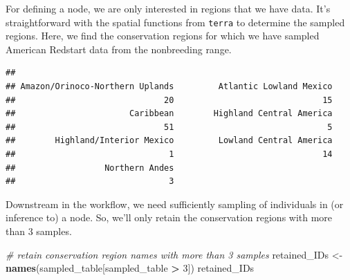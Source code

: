 \documentclass[
]{book}
\newenvironment{Shaded}{\begin{snugshade}}{\end{snugshade}}
\newcommand{\AttributeTok}[1]{\textcolor[rgb]{0.13,0.29,0.53}{#1}}
\newcommand{\CommentTok}[1]{\textcolor[rgb]{0.56,0.35,0.01}{\textit{#1}}}
\newcommand{\DecValTok}[1]{\textcolor[rgb]{0.00,0.00,0.81}{#1}}
\newcommand{\FunctionTok}[1]{\textcolor[rgb]{0.13,0.29,0.53}{\textbf{#1}}}
\newcommand{\NormalTok}[1]{#1}
\newcommand{\OtherTok}[1]{\textcolor[rgb]{0.56,0.35,0.01}{#1}}
\newcommand{\SpecialCharTok}[1]{\textcolor[rgb]{0.81,0.36,0.00}{\textbf{#1}}}
\newcommand{\StringTok}[1]{\textcolor[rgb]{0.31,0.60,0.02}{#1}}
\begin{document}
For defining a node, we are only interested in regions that we have data. It's straightforward with the spatial functions from \texttt{terra} to determine the sampled regions. Here, we find the conservation regions for which we have sampled American Redstart data from the nonbreeding range.

\begin{Shaded}
\end{Shaded}

\begin{verbatim}
## 
## Amazon/Orinoco-Northern Uplands         Atlantic Lowland Mexico 
##                              20                              15 
##                       Caribbean        Highland Central America 
##                              51                               5 
##        Highland/Interior Mexico         Lowland Central America 
##                               1                              14 
##                  Northern Andes 
##                               3
\end{verbatim}

Downstream in the workflow, we need sufficiently sampling of individuals in (or inference to) a node. So, we'll only retain the conservation regions with more than 3 samples.

\begin{Shaded}
\begin{Highlighting}[]
\CommentTok{\# retain conservation region names with more than 3 samples}
\NormalTok{retained\_IDs }\OtherTok{\textless{}{-}} \FunctionTok{names}\NormalTok{(sampled\_table[sampled\_table }\SpecialCharTok{\textgreater{}} \DecValTok{3}\NormalTok{])}
\NormalTok{retained\_IDs}
\end{Highlighting}
\end{Shaded}
\end{document}
